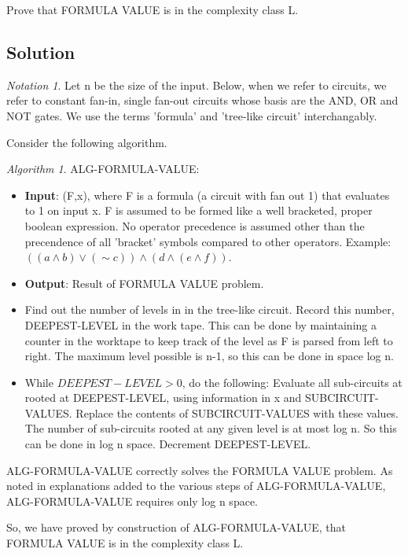 \documentclass[10pt]{amsart}
\theoremstyle{remark}
\newtheorem{alg}[thm]{Algorithm}
\newtheorem{notation}[thm]{Notation}
\begin{document}
Prove that FORMULA VALUE is in the complexity class L.

\subsection{Solution}
\begin{notation}
Let n be the size of the input. Below, when we refer to circuits, we refer to constant fan-in, single fan-out circuits whose basis are the AND, OR and NOT gates. We use the terms 'formula' and 'tree-like circuit' interchangably.
\end{notation}

Consider the following algorithm.

\begin{alg}
ALG-FORMULA-VALUE:
\begin{itemize}
\item \textbf{Input}: (F,x), where F is a formula (a circuit with fan out 1) that evaluates to 1 on input x.
\subitem F is assumed to be formed like a well bracketed, proper boolean expression. No operator precedence is assumed other than the precendence of all 'bracket' symbols compared to other operators. Example: $((a\wedge b)\vee (\sim c))\wedge(d\wedge(e \wedge f))$.
\item \textbf{Output}: Result of FORMULA VALUE problem.
\item Find out the number of levels in in the tree-like circuit. Record this number, DEEPEST-LEVEL in the work tape.
\subitem This can be done by maintaining a counter in the worktape to keep track of the level as F is parsed from left to right. The maximum level possible is n-1, so this can be done in space log n.
\item While $DEEPEST-LEVEL > 0$, do the following:
\subitem Evaluate all sub-circuits at rooted at DEEPEST-LEVEL, using information in x and SUBCIRCUIT-VALUES.
\subitem Replace the contents of SUBCIRCUIT-VALUES with these values.
\subsubitem The number of sub-circuits rooted at any given level is at most log n. So this can be done in log n space.
\subitem Decrement DEEPEST-LEVEL.
\end{itemize}
\end{alg}

ALG-FORMULA-VALUE correctly solves the FORMULA VALUE problem. As noted in explanations added to the various steps of ALG-FORMULA-VALUE, ALG-FORMULA-VALUE requires only log n space.

So, we have proved by construction of ALG-FORMULA-VALUE, that FORMULA VALUE is in the complexity class L.



\end{document}
